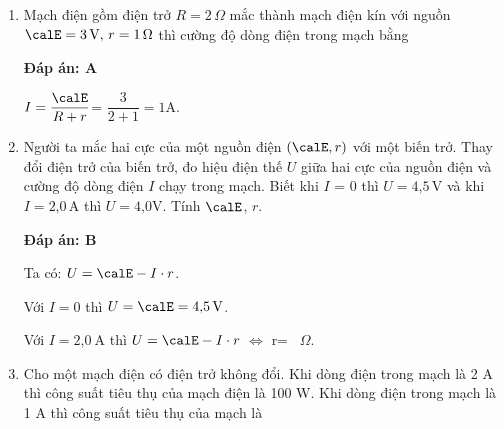 \begin{enumerate}[label=\bfseries Câu \arabic*:]
{	}
	\item {}
	
	
	{	Mạch điện gồm điện trở $R = 2\, \Omega$ mắc thành mạch điện kín với nguồn $\calE= 3\, \text{V},\, r = 1 \, \Omega$  thì cường độ dòng điện trong mạch bằng
	}
	
	\hideall
	{	\textbf{Đáp án: A} 
		
		$I= \dfrac{\calE}{R+r}$= $\dfrac{3}{2+1}=1 \text{A}$. 
		
	}
	\item {}
	
	
	{ Người ta mắc hai cực của một nguồn điện $(\calE,r)$ với một biến trở. Thay đổi điện trở của biến trở, đo hiệu điện thế $U$ giữa hai cực của nguồn điện và cường độ dòng điện $I$ chạy trong mạch. Biết khi $I$ = 0 thì $U= \text{4,5}\, \text{V}$ và khi $I = \text{2,0}\, \text{A}$ thì $U = \text{4,0} \text{V}$. Tính $\calE$, $r$.
	}
	
	\hideall
	{	 \textbf{Đáp án: B} 
		
		Ta có: $U = \calE- I\cdot r$.
		
		Với $I=0$ thì  $U=\calE= \text{4,5}\, \text{V}$.
		
		Với $I = \text{2,0}\ \text{A}$ thì $U=\calE- I\cdot r$ $\Leftrightarrow$ r= \, $\Omega$. 
		
		
		
	}
	\item {}
	
	
	{	Cho một mạch điện có điện trở không đổi. Khi dòng điện trong mạch là 2 A thì công suất tiêu thụ của mạch điện là 100 W. Khi dòng điện trong mạch là 1 A thì công suất tiêu thụ của mạch là
	}
	

\end{enumerate}

